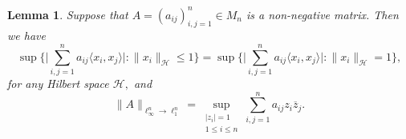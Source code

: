 \documentclass[a4paper,oneside,11pt, reqno]{amsart}
\numberwithin{equation}{section}
\newtheorem{lemma}[theorem]{Lemma}
\theoremstyle{plain}
\begin{document}
\begin{lemma}\label{noteasy} Suppose that $A=(a_{ij})_{i,j=1}^n\in M_n$  is a  non-negative matrix. Then we have 
\[\sup\Big\{\Big|\sum_{i,j=1}^na_{ij}\langle x_i,x_j\rangle\Big|:\|x_i\|_{\mathcal{H}}\leqslant 1\Big\}=\sup\Big\{\Big|\sum_{i,j=1}^na_{ij}\langle x_i,x_j\rangle\Big|:\|x_i\|_{\mathcal{H}}= 1\Big\},\label{(i)}\tag{$\dagger$}\]
for any Hilbert space $\mathcal H,$ and 
\[\|A\|_{\ell_\infty^n\to\ell_1^n}=\sup_{\begin{array}{c}|z_i|=1\\ 1\leqslant i\leqslant n\end{array}} 
\sum_{i,j=1}^n a_{ij}z_i\overline{z}_j.\label{(ii)}\tag{$\ddagger$}\] 
\end{lemma}
\end{document}
